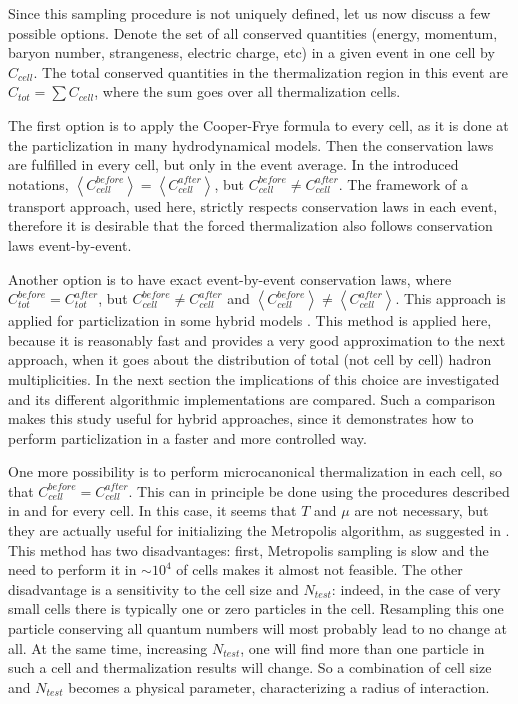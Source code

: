 Since this sampling procedure is not uniquely defined, let us now discuss a few
possible options. Denote the set of all conserved
quantities (energy, momentum, baryon number, strangeness, electric charge, etc)
in a given event in one cell by $C_{cell}$. The total conserved  quantities in
the thermalization region in this event are $C_{tot} = \sum C_{cell}$, where
the sum goes over all thermalization cells.

The first option is to apply the Cooper-Frye formula to every cell, as it is
done at the particlization in many hydrodynamical models. Then the conservation
laws are fulfilled in every cell, but only in the event average. In the introduced
notations, $\left\langle C_{cell}^{before} \right\rangle = \left\langle
C_{cell}^{after} \right\rangle$, but $C_{cell}^{before} \neq C_{cell}^{after}$.
The framework of a transport approach, used here, strictly
respects conservation laws in each event, therefore it is desirable that the forced
thermalization also follows conservation laws event-by-event.

Another option is to have exact event-by-event conservation laws, where
$C_{tot}^{before} = C_{tot}^{after}$, but $C_{cell}^{before} \neq
C_{cell}^{after}$ and $\left\langle C_{cell}^{before} \right\rangle \neq
\left\langle C_{cell}^{after} \right\rangle$. This approach is applied for
particlization in some hybrid models \cite{Petersen:2008dd, Huovinen:2012is}.
This method is applied here, because it is reasonably fast and provides a very good
approximation to the next approach, when it goes about the distribution of
total (not cell by cell) hadron multiplicities. In the next section the implications
of this choice are investigated and its different algorithmic
implementations are compared. Such a comparison makes this study useful for hybrid
approaches, since it demonstrates how to perform particlization in a faster and more
controlled way.

One more possibility is to perform microcanonical thermalization in each cell,
so that $C_{cell}^{before} = C_{cell}^{after}$. This can in principle be done
using the procedures described in \cite{Werner:1995mx} and
\cite{Becattini:2004rq} for every cell. In this case, it seems that $T$ and
$\mu$ are not necessary, but they are actually useful for initializing the
Metropolis algorithm, as suggested in \cite{Becattini:2004rq}. This method has
two disadvantages: first, Metropolis sampling is slow and the need to perform
it in $\sim 10^4$ of cells makes it almost not feasible. The other disadvantage
is a sensitivity to the cell size and $N_{test}$: indeed, in the case of very
small cells there is typically one or zero particles in the cell. Resampling
this one particle conserving all quantum numbers will most probably lead to no
change at all. At the same time,  increasing $N_{test}$, one will find more
than one particle in such a cell and thermalization results will change. So a
combination of cell size and $N_{test}$ becomes a physical parameter,
characterizing a radius of interaction.

